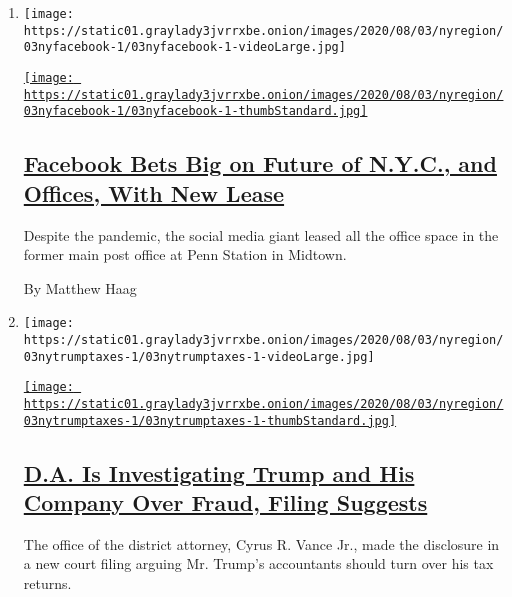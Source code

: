 \begin{enumerate}
\def\labelenumi{\arabic{enumi}.}
\item
  \texttt{[image: https://static01.graylady3jvrrxbe.onion/images/2020/08/03/nyregion/03nyfacebook-1/03nyfacebook-1-videoLarge.jpg]}

  \href{/2020/08/03/nyregion/facebook-nyc-office-farley-building.html}{\texttt{[image: https://static01.graylady3jvrrxbe.onion/images/2020/08/03/nyregion/03nyfacebook-1/03nyfacebook-1-thumbStandard.jpg]}}

  \hypertarget{facebook-bets-big-on-future-of-nyc-and-offices-with-new-lease}{%
  \subsection{\texorpdfstring{\href{/2020/08/03/nyregion/facebook-nyc-office-farley-building.html}{Facebook
  Bets Big on Future of N.Y.C., and Offices, With New
  Lease}}{Facebook Bets Big on Future of N.Y.C., and Offices, With New Lease}}\label{facebook-bets-big-on-future-of-nyc-and-offices-with-new-lease}}

  Despite the pandemic, the social media giant leased all the office
  space in the former main post office at Penn Station in Midtown.

  By Matthew Haag
\item
  \texttt{[image: https://static01.graylady3jvrrxbe.onion/images/2020/08/03/nyregion/03nytrumptaxes-1/03nytrumptaxes-1-videoLarge.jpg]}

  \href{/2020/08/03/nyregion/donald-trump-taxes-cyrus-vance.html}{\texttt{[image: https://static01.graylady3jvrrxbe.onion/images/2020/08/03/nyregion/03nytrumptaxes-1/03nytrumptaxes-1-thumbStandard.jpg]}}

  \hypertarget{da-is-investigating-trump-and-his-company-over-fraud-filing-suggests}{%
  \subsection{\texorpdfstring{\href{/2020/08/03/nyregion/donald-trump-taxes-cyrus-vance.html}{D.A.
  Is Investigating Trump and His Company Over Fraud, Filing
  Suggests}}{D.A. Is Investigating Trump and His Company Over Fraud, Filing Suggests}}\label{da-is-investigating-trump-and-his-company-over-fraud-filing-suggests}}

  The office of the district attorney, Cyrus R. Vance Jr., made the
  disclosure in a new court filing arguing Mr. Trump's accountants
  should turn over his tax returns.


\end{enumerate}
